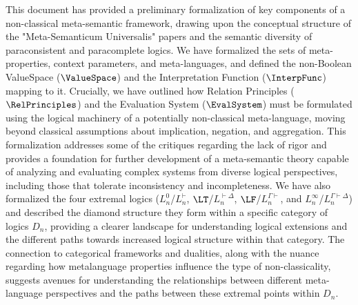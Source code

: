																																																																																					\RaggedRight %
																																																																																					This document has provided a preliminary formalization of key components of a non-classical meta-semantic framework, drawing upon the conceptual structure of the "Meta-Semanticum Universalis" papers and the semantic diversity of paraconsistent and paracomplete logics. We have formalized the sets of meta-properties, context parameters, and meta-languages, and defined the non-Boolean ValueSpace ($\ValueSpace$) and the Interpretation Function ($\InterpFunc$) mapping to it. Crucially, we have outlined how Relation Principles ($\RelPrinciples$) and the Evaluation System ($\EvalSystem$) must be formulated using the logical machinery of a potentially non-classical meta-language, moving beyond classical assumptions about implication, negation, and aggregation. This formalization addresses some of the critiques regarding the lack of rigor and provides a foundation for further development of a meta-semantic theory capable of analyzing and evaluating complex systems from diverse logical perspectives, including those that tolerate inconsistency and incompleteness. We have also formalized the four extremal logics ($L^0_n$/$L^{\vdash}_n$, $\LT$/$L^{\vdash\Delta}_n$, $\LF$/$L^{\Gamma\vdash}_n$, and $L^\infty_n$/$L^{\Gamma\vdash\Delta}_n$) and described the diamond structure they form within a specific category of logics $D_n$, providing a clearer landscape for understanding logical extensions and the different paths towards increased logical structure within that category. The connection to categorical frameworks and dualities, along with the nuance regarding how metalanguage properties influence the type of non-classicality, suggests avenues for understanding the relationships between different meta-language perspectives and the paths between these extremal points within $D_n$.
																																																																																					
